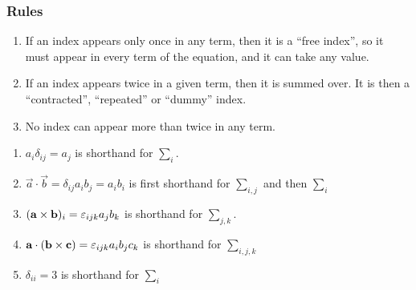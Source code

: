 \documentclass[../main.tex]{subfiles}
\begin{document}
\subsubsection{Rules}
\begin{enumerate}
  \item If an index appears only once in any term, then it is a ``free index'', so it must appear in every term of the equation, and it can take any value.
  \item If an index appears twice in a given term, then it is summed over. It is then a ``contracted'', ``repeated'' or ``dummy'' index.
  \item No index can appear more than twice in any term.
\end{enumerate}
\begin{example}
  \begin{enumerate}
    \item $a_i \delta_{i j} = a_j$ is shorthand for $\sum_{i}$.
    \item $\vec{a} \cdot \vec{b} = \delta_{i j} a_i b_j = a_i b_i$ is first shorthand for $\sum_{i,j}$ and then $\sum_{i}$
    \item $(\boldsymbol{\mathbf{a}} \times \boldsymbol{\mathbf{b}})_i = \varepsilon_{ijk} a_j b_k$ is shorthand for $\sum_{j,k}$.
    \item $\boldsymbol{\mathbf{a}} \cdot (\boldsymbol{\mathbf{b}} \times \boldsymbol{\mathbf{c}}) = \varepsilon_{ijk} a_i b_j c_k$ is shorthand for $\sum_{i,j,k}$
    \item $\delta_{i i} = 3$ is shorthand for $\sum_{i}$
  \end{enumerate}
\end{example}
\end{document}
